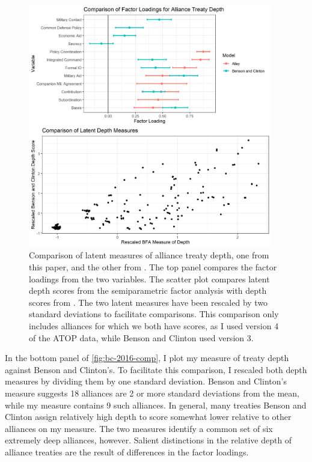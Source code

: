 \documentclass[12pt]{article}
\begin{document}
\begin{figure}[htbp]
	\centering
		\includegraphics[width=0.95\textwidth]{bc-2016-comp.png}
	\caption{Comparison of latent measures of alliance treaty depth, one from this paper, and the other from \citet{BensonClinton2016}. The top panel compares the factor loadings from the two variables. The scatter plot compares latent depth scores from the semiparametric factor analysis with depth scores from \citet{BensonClinton2016}. The two latent measures have been rescaled by two standard deviations to facilitate comparisons. This comparison only includes alliances for which we both have scores, as I used version 4 of the ATOP data, while Benson and Clinton used version 3.}
	\label{fig:bc-2016-comp}
\end{figure}


In the bottom panel of \autoref{fig:bc-2016-comp}, I plot my measure of treaty depth against Benson and Clinton's. 
To facilitate this comparison, I rescaled both depth measures by dividing them by one standard deviation.
Benson and Clinton's measure suggests 18 alliances are 2 or more standard deviations from the mean, while my measure contains 9 such alliances. 
In general, many treaties Benson and Clinton assign relatively high depth to score somewhat lower relative to other alliances on my measure.
The two measures identify a common set of six extremely deep alliances, however. 
Salient distinctions in the relative depth of alliance treaties are the result of differences in the factor loadings. 
\end{document}
